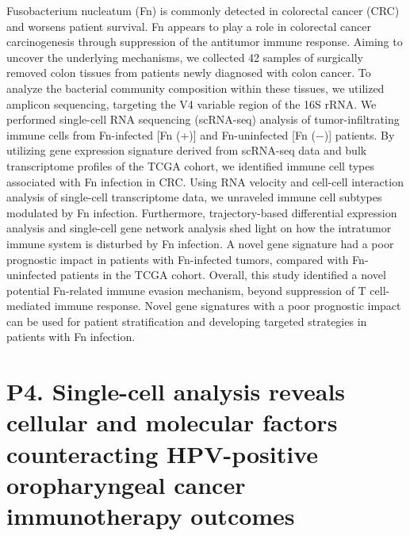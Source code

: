 \noindent
Fusobacterium nucleatum (Fn) is commonly detected in colorectal cancer (CRC) and worsens patient survival. Fn appears to play a role in colorectal cancer carcinogenesis through suppression of the antitumor immune response. Aiming to uncover the underlying mechanisms, we collected 42 samples of surgically removed colon tissues from patients newly diagnosed with colon cancer. To analyze the bacterial community composition within these tissues, we utilized amplicon sequencing, targeting the V4 variable region of the 16S rRNA. We performed single-cell RNA sequencing (scRNA-seq) analysis of tumor-infiltrating immune cells from Fn-infected [Fn (+)] and Fn-uninfected [Fn (−)] patients. By utilizing gene expression signature derived from scRNA-seq data and bulk transcriptome profiles of the TCGA cohort, we identified immune cell types associated with Fn infection in CRC. Using RNA velocity and cell-cell interaction analysis of single-cell transcriptome data, we unraveled immune cell subtypes modulated by Fn infection. Furthermore, trajectory-based differential expression analysis and single-cell gene network analysis shed light on how the intratumor immune system is disturbed by Fn infection. A novel gene signature had a poor prognostic impact in patients with Fn-infected tumors, compared with Fn-uninfected patients in the TCGA cohort. Overall, this study identified a novel potential Fn-related immune evasion mechanism, beyond suppression of T cell-mediated immune response. Novel gene signatures with a poor prognostic impact can be used for patient stratification and developing targeted strategies in patients with Fn infection.
\newpage

\section*{P4. Single-cell analysis reveals cellular and molecular factors counteracting HPV-positive oropharyngeal cancer immunotherapy outcomes}


